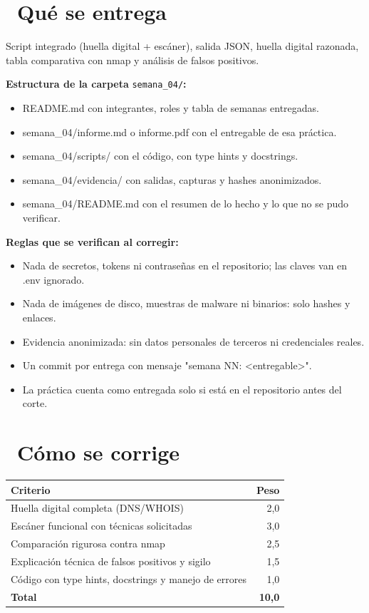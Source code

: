 \documentclass[11pt,a4paper]{article}
\newcommand{\iconotexto}[2]{\textcolor{cyanNeon}{\faIcon{#1}}~#2}
\begin{document}
\section{\iconotexto{box-open}{Qué se entrega}}

Script integrado (huella digital + escáner), salida JSON, huella digital razonada, tabla comparativa con nmap y análisis de falsos positivos.

\textbf{Estructura de la carpeta} \texttt{semana\_04/}\textbf{:}

\begin{itemize}[leftmargin=1.4em,itemsep=2pt,topsep=3pt]
  \item README.md con integrantes, roles y tabla de semanas entregadas.
  \item semana\_04/informe.md o informe.pdf con el entregable de esa práctica.
  \item semana\_04/scripts/ con el código, con type hints y docstrings.
  \item semana\_04/evidencia/ con salidas, capturas y hashes anonimizados.
  \item semana\_04/README.md con el resumen de lo hecho y lo que no se pudo verificar.
\end{itemize}

\textbf{Reglas que se verifican al corregir:}

\begin{itemize}[leftmargin=1.4em,itemsep=2pt,topsep=3pt]
  \item Nada de secretos, tokens ni contraseñas en el repositorio; las claves van en .env ignorado.
  \item Nada de imágenes de disco, muestras de malware ni binarios: solo hashes y enlaces.
  \item Evidencia anonimizada: sin datos personales de terceros ni credenciales reales.
  \item Un commit por entrega con mensaje "semana NN: \textless{}entregable\textgreater{}".
  \item La práctica cuenta como entregada solo si está en el repositorio antes del corte.
\end{itemize}

\section{\iconotexto{ruler-combined}{Cómo se corrige}}

\begin{tabularx}{\linewidth}{@{}X r@{}}
\toprule
Criterio & Peso\\
\midrule
Huella digital completa (DNS/WHOIS) & 2,0 \\
Escáner funcional con técnicas solicitadas & 3,0 \\
Comparación rigurosa contra nmap & 2,5 \\
Explicación técnica de falsos positivos y sigilo & 1,5 \\
Código con type hints, docstrings y manejo de errores & 1,0 \\
\midrule
\textbf{Total} & \textbf{10,0}\\
\bottomrule
\end{tabularx}
\end{document}
